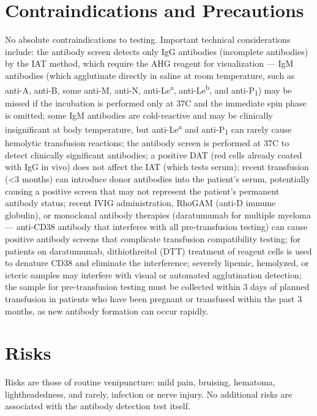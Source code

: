 \section*{Contraindications and Precautions}
No absolute contraindications to testing. Important technical considerations include: the antibody screen detects only IgG antibodies (incomplete antibodies) by the IAT method, which require the AHG reagent for visualization --- IgM antibodies (which agglutinate directly in saline at room temperature, such as anti-A, anti-B, some anti-M, anti-N, anti-Le\textsuperscript{a}, anti-Le\textsuperscript{b}, and anti-P\textsubscript{1}) may be missed if the incubation is performed only at 37\textdegree{}C and the immediate spin phase is omitted; some IgM antibodies are cold-reactive and may be clinically insignificant at body temperature, but anti-Le\textsuperscript{a} and anti-P\textsubscript{1} can rarely cause hemolytic transfusion reactions; the antibody screen is performed at 37\textdegree{}C to detect clinically significant antibodies; a positive DAT (red cells already coated with IgG in vivo) does not affect the IAT (which tests serum); recent transfusion (<3 months) can introduce donor antibodies into the patient's serum, potentially causing a positive screen that may not represent the patient's permanent antibody status; recent IVIG administration, RhoGAM (anti-D immune globulin), or monoclonal antibody therapies (daratumumab for multiple myeloma --- anti-CD38 antibody that interferes with all pre-transfusion testing) can cause positive antibody screens that complicate transfusion compatibility testing; for patients on daratumumab, dithiothreitol (DTT) treatment of reagent cells is used to denature CD38 and eliminate the interference; severely lipemic, hemolyzed, or icteric samples may interfere with visual or automated agglutination detection; the sample for pre-transfusion testing must be collected within 3 days of planned transfusion in patients who have been pregnant or transfused within the past 3 months, as new antibody formation can occur rapidly.

\section*{Risks}
Risks are those of routine venipuncture: mild pain, bruising, hematoma, lightheadedness, and rarely, infection or nerve injury. No additional risks are associated with the antibody detection test itself.

